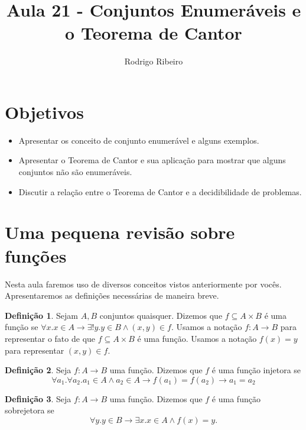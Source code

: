 \documentclass[a4paper]{article}
\theoremstyle{definition}
\newtheorem{Definition}{Definição}
\begin{document}
\title{Aula 21 - Conjuntos Enumeráveis e o Teorema de Cantor}
  \author{Rodrigo Ribeiro}

  \maketitle

  \pagestyle{fancy}


  \section*{Objetivos}

  \begin{itemize}
     \item Apresentar os conceito de conjunto enumerável e alguns
       exemplos.
     \item Apresentar o Teorema de Cantor e sua aplicação para
       mostrar que alguns conjuntos não são enumeráveis.
     \item Discutir a relação entre o Teorema de Cantor e a
       decidibilidade de problemas.
  \end{itemize}

  \section{Uma pequena revisão sobre funções}

  Nesta aula faremos uso de diversos conceitos vistos anteriormente por vocês.
  Apresentaremos as definições necessárias de maneira breve.

  \begin{Definition}
    Sejam $A,B$ conjuntos quaisquer. Dizemos que $f \subseteq A \times B$ é uma
    função se $\forall x. x \in A \to \exists ! y . y \in B \land (x,y) \in f$.
    Usamos a notação $f : A \to B$ para representar o fato de que $f \subseteq
    A\times B$ é uma função. Usamos a notação $f(x) = y$ para representar
    $(x,y) \in f$.
  \end{Definition}

  \begin{Definition}
    Seja $f : A\to B$ uma função. Dizemos que $f$ é uma função injetora se
    \[
      \forall a_1.\forall a_2.  a_1 \in A \land a_2 \in A \to f(a_1) = f(a_2)
      \to a_1 = a_2
    \]
  \end{Definition}

  \begin{Definition}
    Seja $f : A\to B$ uma função. Dizemos que $f$ é uma função sobrejetora se
    \[
      \forall y . y \in B \to \exists x. x \in A \land f(x) = y.
    \]
  \end{Definition}
  
\end{document}
